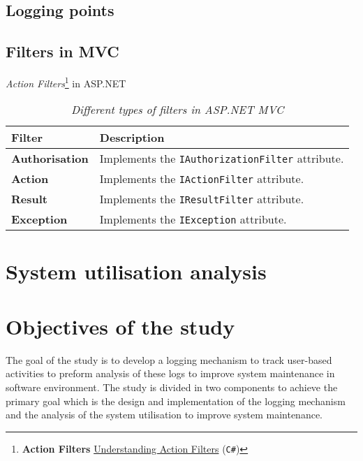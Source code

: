 \subsection{Logging points}\label{sec:Ch1_LoggignPoints}

\subsection{Filters in MVC}\label{sec:Ch1_FiltersMVC}

\emph{Action Filters}\cprotect\footnote{\textbf{Action Filters} \href{https://docs.microsoft.com/en-us/aspnet/mvc/overview/older-versions-1/controllers-and-routing/understanding-action-filters-cs}{Understanding Action Filters} (\verb|C#|)} in ASP.NET

\begin{table}[!htb]
	\centering
	\small
	\caption[Different types of filters in ASP.NET MVC]
	{\textit{Different types of filters in ASP.NET MVC}}
	\label{tbl:Ch1_ASPFilters}
	\begin{tabularx}{\textwidth}{|l|X|}
		\hline \textbf{Filter} & \textbf{Description} \\
		\hline \textbf{Authorisation} & Implements the \texttt{IAuthorizationFilter} attribute. \\
		\hline \textbf{Action} & Implements the \texttt{IActionFilter} attribute. \\
		\hline \textbf{Result} & Implements the \texttt{IResultFilter} attribute. \\
		\hline \textbf{Exception} & Implements the \texttt{IException} attribute. \\
		\hline
	\end{tabularx}
\end{table}

\clearpage

\section{System utilisation analysis}\label{sec:SystemUtilisation}

\clearpage

\section{Objectives of the study}
The goal of the study is to develop a logging mechanism to track user-based activities to preform analysis of these logs to improve system maintenance in software environment. The study is divided in two components to achieve the primary goal which is the design and implementation of the logging mechanism and the analysis of the system utilisation to improve system maintenance.

